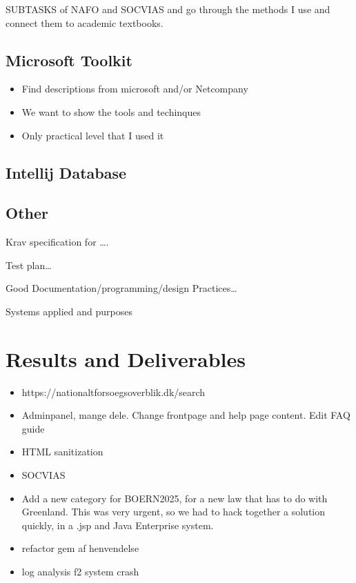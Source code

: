 \documentclass[../main.tex]{subfiles}
\begin{document}
SUBTASKS of NAFO and SOCVIAS and go through the methods I use and connect them to academic textbooks.  


\subsection{Microsoft Toolkit}

\begin{itemize}
\item Find descriptions from microsoft and/or Netcompany
\item We want to show the tools and techinques
\item Only practical level that I used it
\end{itemize}

\subsection{Intellij Database}
\subsection{Other}
Krav specification for …. 

Test plan… 

Good Documentation/programming/design Practices… 

Systems applied and purposes 


\section{Results and Deliverables}

\begin{itemize}
    \item https://nationaltforsoegsoverblik.dk/search 
    \item Adminpanel, mange dele. Change frontpage and help page content. Edit FAQ guide 
    \item HTML sanitization 
    \item SOCVIAS 
    \item Add a new category for BOERN2025, for a new law that has to do with Greenland. This was very urgent, so we had to hack together a solution quickly, in a .jsp and Java Enterprise system. 
    \item refactor gem af henvendelse
    \item log analysis f2 system crash
\end{itemize}
\end{document}
